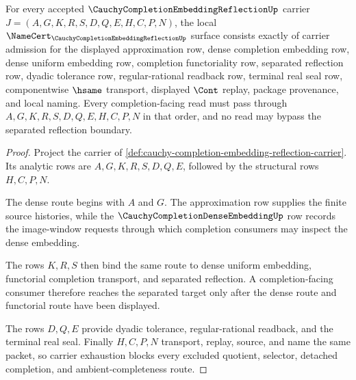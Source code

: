 \begin{theorem}
\label{thm:cauchy-completion-embedding-reflection-namecert-obligations}
For every accepted $\CauchyCompletionEmbeddingReflectionUp$ carrier $J=(A,G,K,R,S,D,Q,E,H,C,P,N)$, the local $\NameCert_{\CauchyCompletionEmbeddingReflectionUp}$ surface consists exactly of carrier admission for the displayed approximation row, dense completion embedding row, dense uniform embedding row, completion functoriality row, separated reflection row, dyadic tolerance row, regular-rational readback row, terminal real seal row, componentwise $\hsame$ transport, displayed $\Cont$ replay, package provenance, and local naming. Every completion-facing read must pass through $A,G,K,R,S,D,Q,E,H,C,P,N$ in that order, and no read may bypass the separated reflection boundary.
\end{theorem}
\begin{proof}
Project the carrier of \autoref{def:cauchy-completion-embedding-reflection-carrier}. Its analytic rows are $A,G,K,R,S,D,Q,E$, followed by the structural rows $H,C,P,N$.

The dense route begins with $A$ and $G$. The approximation row supplies the finite source histories, while the $\CauchyCompletionDenseEmbeddingUp$ row records the image-window requests through which completion consumers may inspect the dense embedding.

The rows $K,R,S$ then bind the same route to dense uniform embedding, functorial completion transport, and separated reflection. A completion-facing consumer therefore reaches the separated target only after the dense route and functorial route have been displayed.

The rows $D,Q,E$ provide dyadic tolerance, regular-rational readback, and the terminal real seal. Finally $H,C,P,N$ transport, replay, source, and name the same packet, so carrier exhaustion blocks every excluded quotient, selector, detached completion, and ambient-completeness route.
\end{proof}

